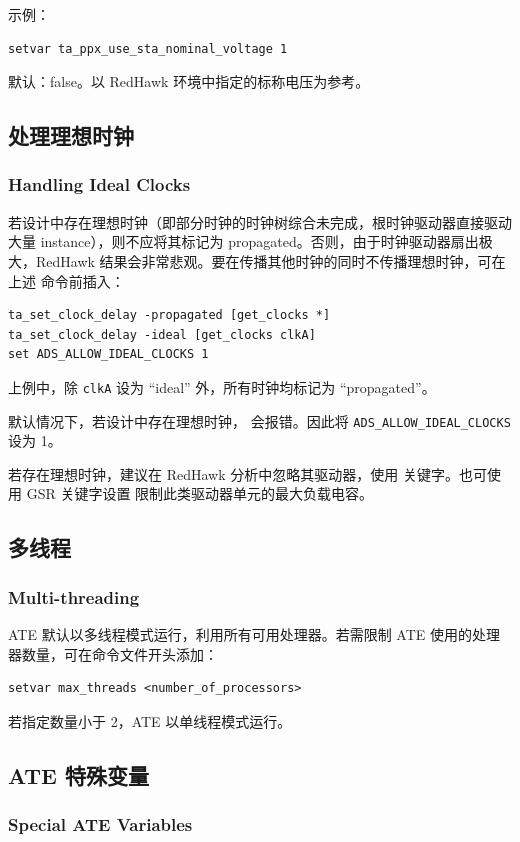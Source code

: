 示例：
\begin{lstlisting}
setvar ta_ppx_use_sta_nominal_voltage 1
\end{lstlisting}
默认：false。以 RedHawk 环境中指定的标称电压为参考。

\subsection{处理理想时钟}
\subsubsection*{Handling Ideal Clocks}

若设计中存在理想时钟（即部分时钟的时钟树综合未完成，根时钟驱动器直接驱动大量 instance），则不应将其标记为 propagated。否则，由于时钟驱动器扇出极大，RedHawk 结果会非常悲观。要在传播其他时钟的同时不传播理想时钟，可在上述  命令前插入：
\begin{lstlisting}
ta_set_clock_delay -propagated [get_clocks *]
ta_set_clock_delay -ideal [get_clocks clkA]
set ADS_ALLOW_IDEAL_CLOCKS 1
\end{lstlisting}
上例中，除 \texttt{clkA} 设为 ``ideal'' 外，所有时钟均标记为 ``propagated''。

默认情况下，若设计中存在理想时钟， 会报错。因此将 \texttt{ADS\_ALLOW\_IDEAL\_CLOCKS} 设为 1。

若存在理想时钟，建议在 RedHawk 分析中忽略其驱动器，使用  关键字。也可使用 GSR 关键字设置  限制此类驱动器单元的最大负载电容。

\subsection{多线程}
\subsubsection*{Multi-threading}

ATE 默认以多线程模式运行，利用所有可用处理器。若需限制 ATE 使用的处理器数量，可在命令文件开头添加：
\begin{lstlisting}
setvar max_threads <number_of_processors>
\end{lstlisting}
若指定数量小于 2，ATE 以单线程模式运行。

\subsection{ATE 特殊变量}
\subsubsection*{Special ATE Variables}

